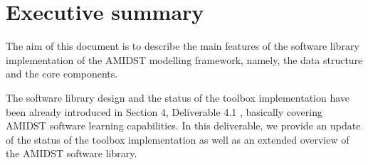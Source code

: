 \section{Executive summary}\label{section:executiveSummary}

The aim of this document is to describe the main features of the software library implementation of the AMIDST modelling framework, namely, the data structure and the core components. 

The software library design and the status of the toolbox implementation have been already introduced in Section 4, Deliverable 4.1 \cite{Deliverable4.1}, basically covering AMIDST software learning capabilities. In this deliverable, we provide an update of the status of the toolbox implementation as well as an extended overview of the AMIDST software library.  







